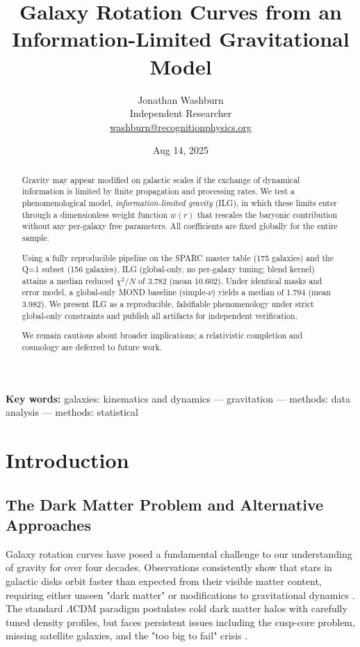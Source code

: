 \documentclass[12pt,a4paper]{article}
\title{Galaxy Rotation Curves from an Information-Limited Gravitational Model}
\author{Jonathan Washburn\\
Independent Researcher\\
\href{mailto:washburn@recognitionphysics.org}{washburn@recognitionphysics.org}}
\date{Aug 14, 2025}
\begin{document}
\maketitle

\begin{abstract}
Gravity may appear modified on galactic scales if the exchange of dynamical information is limited by finite propagation and processing rates. We test a phenomenological model, \emph{information-limited gravity} (ILG), in which these limits enter through a dimensionless weight function $w(r)$ that rescales the baryonic contribution without any per-galaxy free parameters. All coefficients are fixed globally for the entire sample.

Using a fully reproducible pipeline on the SPARC master table (175 galaxies) and the Q=1 subset (156 galaxies), ILG (global-only, no per-galaxy tuning; blend kernel) attains a median reduced $\chi^2/N$ of 3.782 (mean 10.602). Under identical masks and error model, a global-only MOND baseline (simple-$\nu$) yields a median of 1.794 (mean 3.982). We present ILG as a reproducible, falsifiable phenomenology under strict global-only constraints and publish all artifacts for independent verification.

We remain cautious about broader implications; a relativistic completion and cosmology are deferred to future work.
\end{abstract}

\noindent\textbf{Key words:} galaxies: kinematics and dynamics — gravitation — methods: data analysis — methods: statistical

\section{Introduction}

\subsection{The Dark Matter Problem and Alternative Approaches}

Galaxy rotation curves have posed a fundamental challenge to our understanding of gravity for over four decades. Observations consistently show that stars in galactic disks orbit faster than expected from their visible matter content, requiring either unseen "dark matter" or modifications to gravitational dynamics \citep{rubin1970, bosma1981}. The standard $\Lambda$CDM paradigm postulates cold dark matter halos with carefully tuned density profiles, but faces persistent issues including the cusp-core problem, missing satellite galaxies, and the "too big to fail" crisis \citep{bullock2017, boylan2013}.
\end{document}

